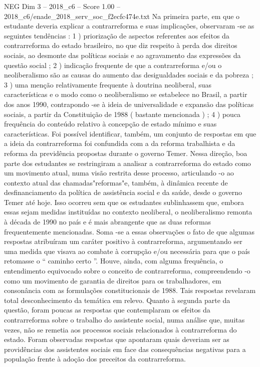 \begin{textsample}{NEG Dim 3 – 2018\_c6 – Score 1.00 – 2018\_c6/enade\_2018\_serv\_soc\_f2ecfc474e.txt}
Na primeira parte, em que o estudante deveria explicar a contrarreforma e suas implicações, observaram -se as seguintes tendências : 1 ) priorização de aspectos referentes aos efeitos da contrarreforma do estado brasileiro, no que diz respeito à perda dos direitos sociais, ao desmonte das políticas sociais e ao agravamento das expressões da questão social ; 2 ) indicação frequente de que a contrarreforma e/ou o neoliberalismo são as causas do aumento das desigualdades sociais e da pobreza ; 3 ) uma menção relativamente frequente à doutrina neoliberal, suas características e o modo como o neoliberalismo se estabelece no Brasil, a partir dos anos 1990, contrapondo -se à ideia de universalidade e expansão das políticas sociais, a partir da Constituição de 1988 ( bastante mencionada ) ; 4 ) pouca frequência do conteúdo relativo à concepção de estado mínimo e suas características.
Foi possível identificar, também, um conjunto de respostas em que a ideia da contrarreforma foi confundida com a da reforma trabalhista e da reforma da previdência propostas durante o governo Temer.
Nessa direção, boa parte dos estudantes se restringiram a analisar a contrarreforma do estado como um movimento atual, numa visão restrita desse processo, articulando -o ao contexto atual das chamadas"reformas"e, também, à dinâmica recente de desfinanciamento da política de assistência social e da saúde, desde o governo Temer até hoje.
Isso ocorreu sem que os estudantes sublinhassem que, embora essas sejam medidas instituídas no contexto neoliberal, o neoliberalismo remonta à década de 1990 no país e é mais abrangente que as duas reformas frequentemente mencionadas.
Soma -se a essas observações o fato de que algumas respostas atribuíram um caráter positivo à contrarreforma, argumentando ser uma medida que visava ao combate à corrupção e/ou necessária para que o país retomasse o “ caminho certo ”.
Houve, ainda, com alguma frequência, o entendimento equivocado sobre o conceito de contrarreforma, compreendendo -o como um movimento de garantia de direitos para os trabalhadores, em consonância com as formulações constitucionais de 1988.
Tais respostas revelaram total desconhecimento da temática em relevo.
Quanto à segunda parte da questão, foram poucas as respostas que contemplaram os efeitos da contrarreforma sobre o trabalho do assistente social, numa análise que, muitas vezes, não se remetia aos processos sociais relacionados à contrarreforma do estado.
Foram observadas respostas que apontaram quais deveriam ser as providências dos assistentes sociais em face das consequências negativas para a população frente à adoção dos preceitos da contrarreforma.

\end{textsample}
